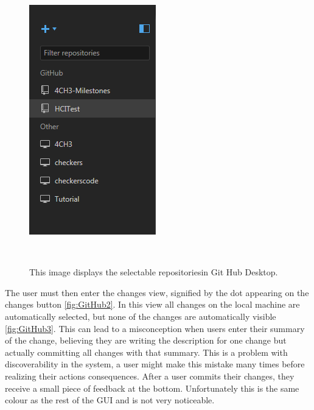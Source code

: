 \documentclass{sigchi}
\begin{document}
\begin{figure}
  \centering
  \includegraphics[width=1.75\columnwidth]{figures/GitHub/Git-Hub-Repositories.PNG}
  \caption{This image displays the selectable repositoriesin Git Hub Desktop.}~\label{fig:GitHub1}
\end{figure}

The user must then enter the changes view, signified by the dot appearing on the changes 
button \ref{fig:GitHub2}. In this view all changes on the local machine are automatically selected, but none of the 
changes are automatically visible \ref{fig:GitHub3}. This can lead to a misconception when users enter their summary
of the change, believing they are writing the description for one change but actually committing 
all changes with that summary. This is a problem with discoverability in the system, a user might 
make this mistake many times before realizing their actions consequences. After a user commits their 
changes, they receive a small piece of feedback at the bottom. Unfortunately this is the same colour 
as the rest of the GUI and is not very noticeable.
\end{document}

